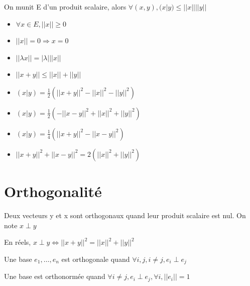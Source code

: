 \documentclass[french]{yLectureNote}
\begin{document}
\begin{proposition}
    On munit E d'un produit scalaire, alors $\forall(x,y), (x|y) \leq ||x||||y||$

\end{proposition}
\begin{proposition}
    \begin{itemize}
        \item $\forall x\in E, ||x||\geq 0$
        \item $||x|| = 0 \Rightarrow x=0$
        \item $||\lambda x|| = |\lambda|||x||$
        \item $||x+y|| \leq ||x||+||y||$
    \end{itemize}

\end{proposition}

\begin{proposition}
    \begin{itemize}
        \item $(x|y) = \frac12 (||x+y||^2-||x||^2-||y||^2)$
        \item $(x|y) = \frac12(-||x-y||^2+||x||^2+||y||^2)$
        \item $(x|y) = \frac14(||x+y||^2-||x-y||^2)$
        \item $||x+y||^2+||x-y||^2 = 2(||x||^2+||y||^2)$
    \end{itemize}

\end{proposition}

\section{Orthogonalité}

\begin{definition}
    Deux vecteurs y et x sont orthogonaux quand leur produit scalaire est nul. On note $x\perp y$

\end{definition}

\begin{theorem}
[Pythagore]
    En réels, $x\perp y\iff ||x+y||^2 = ||x||^2+||y||^2$

\end{theorem}
\begin{definition}
Une base $e_1,\dots,e_n$ est orthogonale quand $\forall i,j, i\neq j, e_i\perp e_j$ 

    Une base est orthonormée quand $\forall i\neq j, e_i\perp e_j, \forall i, ||e_i||=1$

\end{definition}
\end{document}

